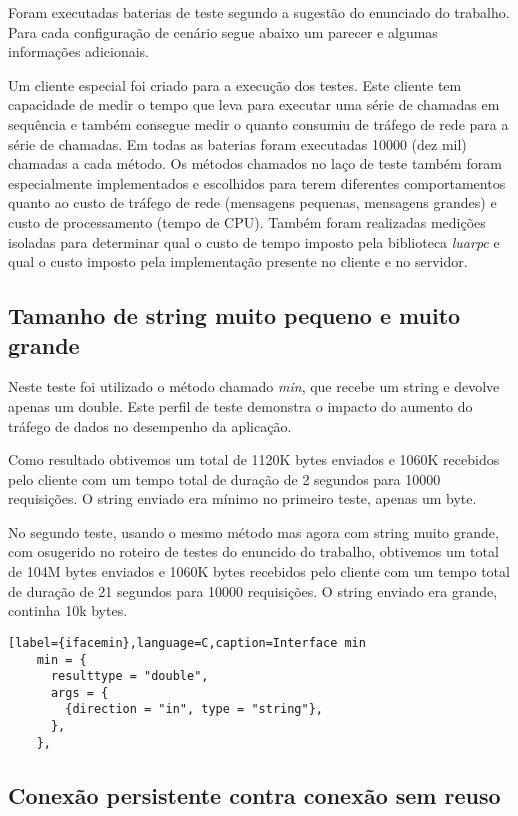 \documentclass[11pt]{article}
\begin{document}
Foram executadas baterias de teste segundo a sugestão do enunciado do trabalho.
Para cada configuração de cenário segue abaixo um parecer e algumas informações
adicionais.

Um cliente especial foi criado para a execução dos testes. Este cliente tem
capacidade de medir o tempo que leva para executar uma série de chamadas em
sequência e também consegue medir o quanto consumiu de tráfego de rede para a
série de chamadas. Em todas as baterias foram executadas 10000 (dez mil)
chamadas a cada método. Os métodos chamados no laço de teste também foram
especialmente implementados e escolhidos para terem diferentes comportamentos
quanto ao custo de tráfego de rede (mensagens pequenas, mensagens grandes) e
custo de processamento (tempo de CPU). Também foram realizadas medições isoladas
para determinar qual o custo de tempo imposto pela biblioteca \textit{luarpc} e
qual o custo imposto pela implementação presente no cliente e no servidor.

\subsection{Tamanho de string muito pequeno e muito grande}\label{subsec:stringsize}

Neste teste foi utilizado o método chamado \textit{min}, que recebe um string e
devolve apenas um double. Este perfil de teste demonstra o impacto do aumento
do tráfego de dados no desempenho da aplicação.

Como resultado obtivemos um total de 1120K bytes enviados e 1060K recebidos pelo
cliente com um tempo total de duração de 2 segundos para 10000 requisições. O
string enviado era mínimo no primeiro teste, apenas um byte.

No segundo teste, usando o mesmo método mas agora com string muito grande, com
osugerido no roteiro de testes do enuncido do trabalho, obtivemos um total de
104M bytes enviados e 1060K bytes recebidos pelo cliente com um tempo total de
duração de 21 segundos para 10000 requisições. O string enviado era grande,
continha 10k bytes.

\begin{lstlisting}[label={ifacemin},language=C,caption=Interface min
    min = {
      resulttype = "double",
      args = {
        {direction = "in", type = "string"},
      },
    },
\end{lstlisting}

\subsection{Conexão persistente contra conexão sem reuso}\label{subsec:persist}
\end{document}
